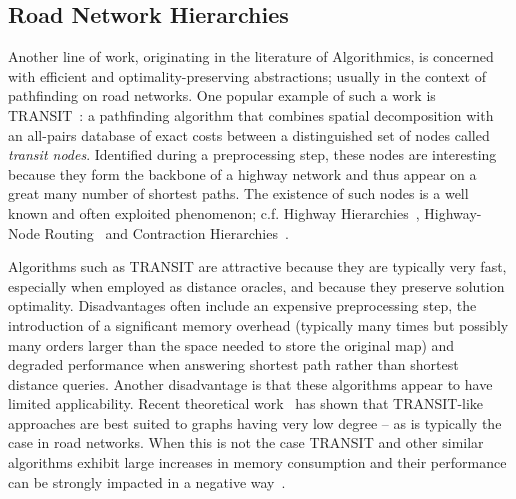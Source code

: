 \subsection{Road Network Hierarchies}
Another line of work, originating in the literature of Algorithmics, is concerned with efficient 
and optimality-preserving abstractions; usually in the context of pathfinding on road networks.
One popular example of such a work is TRANSIT~\citep{bast06,bast07}: a pathfinding algorithm that combines
spatial decomposition with an all-pairs database of exact costs between a distinguished set of nodes
called \emph{transit nodes}. Identified during a preprocessing step, these nodes are interesting 
because they form the backbone of a highway network and thus appear on a great many number of 
shortest paths. The existence of such nodes is a well known and often exploited
phenomenon; c.f. Highway Hierarchies~\citep{sanders05,sanders06}, Highway-Node Routing~\citep{schultes07}
and Contraction Hierarchies~\citep{geisberger08}. 

Algorithms such as TRANSIT are attractive because they are typically very fast, especially when
employed as distance oracles, and because they preserve solution optimality. Disadvantages often
include an expensive preprocessing step, the introduction of a significant memory overhead
(typically many times but possibly many orders larger than the space needed to store the original
map) and degraded performance when answering shortest path rather than shortest distance queries.
Another disadvantage is that these algorithms appear to have limited applicability. Recent
theoretical work~\citep{abraham10} has shown that TRANSIT-like approaches are best suited to graphs
having very low degree -- as is typically the case in road networks.  When this is not the case
TRANSIT and other similar algorithms exhibit large increases in memory consumption and their
performance can be strongly impacted in a negative way~\citep{antsfeld12}.
